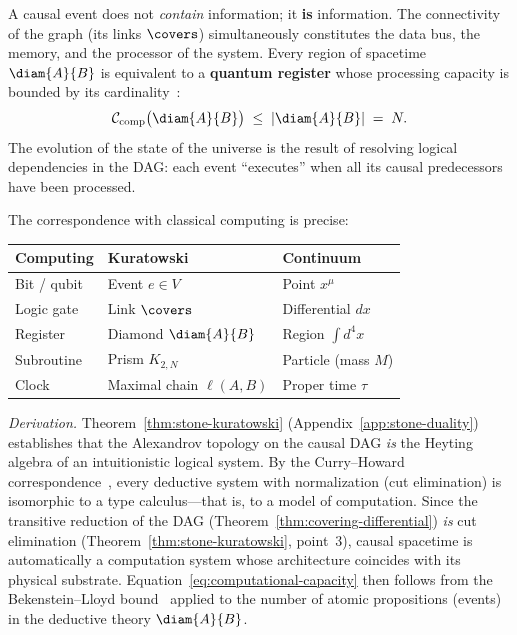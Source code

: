 \begin{theorem}
\label{cor:kuratowski-turing}
A causal event does not \emph{contain} information;
it \textbf{is} information. The connectivity of the graph (its links
$\covers$) simultaneously constitutes the data bus, the memory, and the
processor of the system. Every region of spacetime
$\diam{A}{B}$ is equivalent to a \textbf{quantum register} whose
processing capacity is bounded by its
cardinality~\cite{bekenstein1981,lloyd2002}:
\begin{equation}
  \mathcal{C}_{\text{comp}}\bigl(\diam{A}{B}\bigr)
  \;\leq\; |\diam{A}{B}| \;=\; N.
  \label{eq:computational-capacity}
\end{equation}
The evolution of the state of the universe is the result of resolving
logical dependencies in the DAG: each event ``executes'' when all its
causal predecessors have been processed.
\end{theorem}

\noindent
The correspondence with classical computing is precise:

\medskip
\begin{center}
\begin{tabular}{lll}
\toprule
\textbf{Computing} & \textbf{Kuratowski} & \textbf{Continuum}\\
\midrule
Bit / qubit     & Event $e \in V$
                & Point $x^\mu$\\
Logic gate      & Link $\covers$
                & Differential $dx$\\
Register        & Diamond $\diam{A}{B}$
                & Region $\int d^4x$\\
Subroutine      & Prism $K_{2,N}$
                & Particle (mass $M$)\\
Clock           & Maximal chain $\ell(A,B)$
                & Proper time $\tau$\\
\bottomrule
\end{tabular}
\end{center}

\medskip\noindent
\textit{Derivation.}
Theorem~\ref{thm:stone-kuratowski} (Appendix~\ref{app:stone-duality})
establishes that the Alexandrov topology on the causal DAG \emph{is} the
Heyting algebra of an intuitionistic logical system. By the
Curry--Howard correspondence~\cite{curryhoward}, every deductive system
with normalization (cut elimination) is isomorphic to a type
calculus---that is, to a model of computation. Since the transitive
reduction of the DAG (Theorem~\ref{thm:covering-differential}) \emph{is}
cut elimination (Theorem~\ref{thm:stone-kuratowski}, point~3), causal
spacetime is automatically a computation system whose architecture
coincides with its physical substrate.
Equation~\eqref{eq:computational-capacity} then follows from the
Bekenstein--Lloyd bound~\cite{bekenstein1981,lloyd2002} applied to the
number of atomic propositions (events) in the deductive theory
$\diam{A}{B}$.

